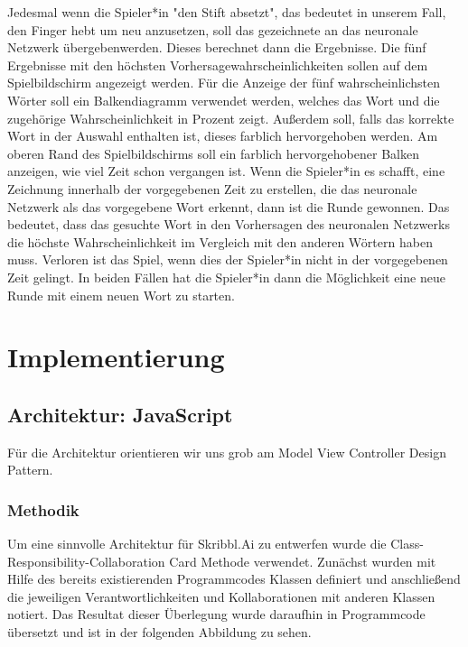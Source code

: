 \documentclass[11pt]{article}
\begin{document}
Jedesmal wenn die Spieler*in "den Stift absetzt", das bedeutet in unserem Fall, den Finger hebt um neu anzusetzen, soll das gezeichnete an das neuronale Netzwerk übergebenwerden. Dieses berechnet dann die Ergebnisse. Die fünf Ergebnisse mit den höchsten Vorhersagewahrscheinlichkeiten sollen auf dem Spielbildschirm angezeigt werden. Für die Anzeige der fünf wahrscheinlichsten Wörter soll ein Balkendiagramm verwendet werden, welches das Wort und die zugehörige Wahrscheinlichkeit in Prozent zeigt. Außerdem soll, falls das korrekte Wort in der Auswahl enthalten ist, dieses farblich hervorgehoben werden. Am oberen Rand des Spielbildschirms soll ein farblich hervorgehobener Balken anzeigen, wie viel Zeit schon vergangen ist. Wenn die Spieler*in es schafft, eine Zeichnung innerhalb der vorgegebenen Zeit zu erstellen, die das neuronale Netzwerk als das vorgegebene Wort erkennt, dann ist die Runde gewonnen. Das bedeutet, dass das gesuchte Wort in den Vorhersagen des neuronalen Netzwerks die höchste Wahrscheinlichkeit im Vergleich mit den anderen Wörtern haben muss. Verloren ist das Spiel, wenn dies der Spieler*in nicht in der vorgegebenen Zeit gelingt. In beiden Fällen hat die Spieler*in dann die Möglichkeit eine neue Runde mit einem neuen Wort zu starten.

\section{Implementierung}
\subsection{Architektur: JavaScript}
Für die Architektur orientieren wir uns grob am Model View Controller Design Pattern.
\subsubsection{Methodik}
Um eine sinnvolle Architektur für Skribbl.Ai zu entwerfen wurde die Class-Responsibility-Collaboration Card Methode verwendet. Zunächst wurden mit Hilfe des bereits existierenden Programmcodes Klassen definiert und anschließend die jeweiligen Verantwortlichkeiten und Kollaborationen mit anderen Klassen notiert. Das Resultat dieser Überlegung wurde daraufhin in Programmcode übersetzt und ist in der folgenden Abbildung zu sehen.
\end{document}
